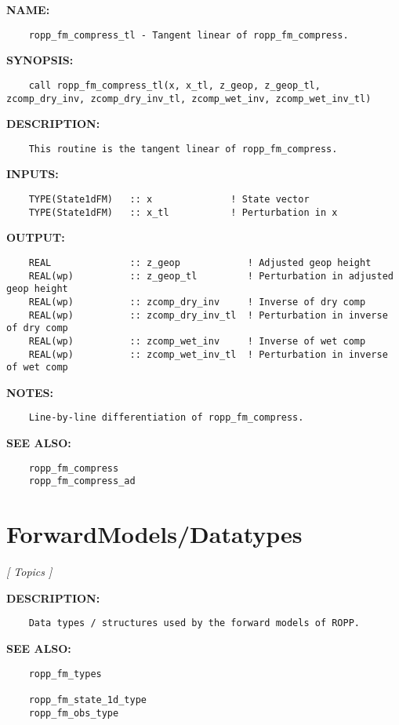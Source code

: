 \label{ch:robo22}
\label{ch:Compressibility_ropp_fm_compress_tl}
\textbf{NAME:}\hspace{0.08in}\begin{Verbatim}
    ropp_fm_compress_tl - Tangent linear of ropp_fm_compress.
\end{Verbatim}
\textbf{SYNOPSIS:}\hspace{0.08in}\begin{Verbatim}
    call ropp_fm_compress_tl(x, x_tl, z_geop, z_geop_tl, zcomp_dry_inv, zcomp_dry_inv_tl, zcomp_wet_inv, zcomp_wet_inv_tl)
\end{Verbatim}
\textbf{DESCRIPTION:}\hspace{0.08in}\begin{Verbatim}
    This routine is the tangent linear of ropp_fm_compress.
\end{Verbatim}
\textbf{INPUTS:}\hspace{0.08in}\begin{Verbatim}
    TYPE(State1dFM)   :: x              ! State vector
    TYPE(State1dFM)   :: x_tl           ! Perturbation in x
\end{Verbatim}
\textbf{OUTPUT:}\hspace{0.08in}\begin{Verbatim}
    REAL              :: z_geop            ! Adjusted geop height
    REAL(wp)          :: z_geop_tl         ! Perturbation in adjusted geop height
    REAL(wp)          :: zcomp_dry_inv     ! Inverse of dry comp
    REAL(wp)          :: zcomp_dry_inv_tl  ! Perturbation in inverse of dry comp
    REAL(wp)          :: zcomp_wet_inv     ! Inverse of wet comp
    REAL(wp)          :: zcomp_wet_inv_tl  ! Perturbation in inverse of wet comp
\end{Verbatim}
\textbf{NOTES:}\hspace{0.08in}\begin{Verbatim}
    Line-by-line differentiation of ropp_fm_compress.
\end{Verbatim}
\textbf{SEE ALSO:}\hspace{0.08in}\begin{Verbatim}
    ropp_fm_compress
    ropp_fm_compress_ad
\end{Verbatim}
\section{ForwardModels/Datatypes}
\textsl{[ Topics ]}

\label{ch:robo44}
\label{ch:ForwardModels_Datatypes}
\textbf{DESCRIPTION:}\hspace{0.08in}\begin{Verbatim}
    Data types / structures used by the forward models of ROPP.
\end{Verbatim}
\textbf{SEE ALSO:}\hspace{0.08in}\begin{Verbatim}
    ropp_fm_types

    ropp_fm_state_1d_type
    ropp_fm_obs_type
\end{Verbatim}

